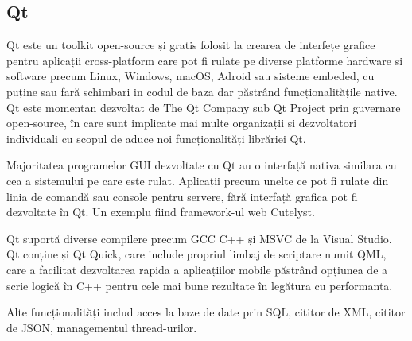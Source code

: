 \subsection{Qt}

Qt este un toolkit open-source și gratis folosit la crearea de interfețe grafice pentru aplicații cross-platform care 
pot fi rulate pe diverse platforme hardware si software precum Linux, Windows, macOS, Adroid sau sisteme embeded, 
cu puține sau fară schimbari in codul de baza dar păstrând funcționalitățile native. Qt este momentan dezvoltat 
de The Qt Company sub Qt Project prin guvernare open-source, în care sunt implicate mai multe organizații și dezvoltatori 
individuali cu scopul de aduce noi funcționalități librăriei Qt.\newline

Majoritatea programelor GUI dezvoltate cu Qt au o interfață nativa similara cu cea a sistemului pe care este rulat. 
Aplicații precum unelte ce pot fi rulate din linia de comandă sau console pentru servere, fără interfață grafica pot fi 
dezvoltate în Qt. Un exemplu fiind framework-ul web Cutelyst.\newline

Qt suportă diverse compilere precum GCC C++ și MSVC de la Visual Studio. Qt conține și Qt Quick, care include propriul 
limbaj de scriptare numit QML, care a facilitat dezvoltarea rapida a aplicațiilor mobile păstrând opțiunea de a scrie 
logică în C++ pentru cele mai bune rezultate în legătura cu performanta.\newline

Alte funcționalități includ acces la baze de date prin SQL, cititor de XML, cititor de JSON, managementul thread-urilor.\newline


